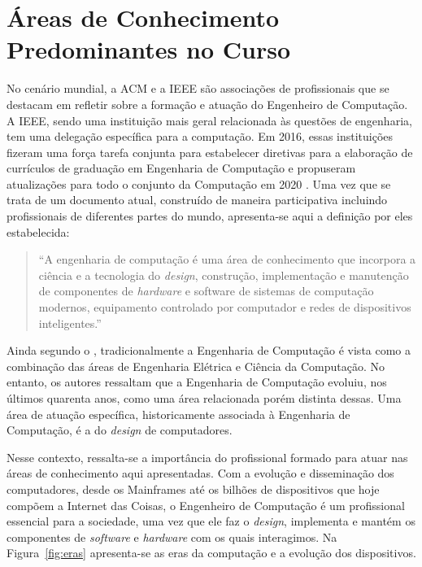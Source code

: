 
\section{Áreas de Conhecimento Predominantes no Curso}

No cenário mundial, a ACM e a IEEE são associações de profissionais que se destacam em refletir sobre a formação e atuação do Engenheiro de Computação. A IEEE, sendo uma instituição mais geral relacionada às questões de engenharia, tem uma delegação específica para a computação. Em 2016, essas instituições fizeram uma força tarefa conjunta para estabelecer diretivas para a elaboração de currículos de graduação em Engenharia de Computação \cite{CE2016} e propuseram atualizações para todo o conjunto da Computação em 2020 \cite{CC2020}.  Uma vez que se trata de um documento atual, construído de maneira participativa incluindo profissionais de diferentes partes do mundo, apresenta-se aqui a definição por eles estabelecida:

\begin{quote}
    ``A engenharia de computação é uma área de conhecimento que incorpora a ciência e a tecnologia do \textit{design}, construção, implementação e manutenção de componentes de \textit{hardware} e software de sistemas de computação modernos, equipamento controlado por computador e redes de dispositivos inteligentes.''~\cite[p.15]{CE2016}
\end{quote}

Ainda segundo o \textcite{CE2016}, tradicionalmente a Engenharia de Computação é vista como a combinação das áreas de Engenharia Elétrica e Ciência da Computação. No entanto, os autores ressaltam que a Engenharia de Computação evoluiu, nos últimos quarenta anos, como uma área relacionada porém distinta dessas. Uma área de atuação específica, historicamente associada à Engenharia de Computação, é a do \textit{design} de computadores.


Nesse contexto, ressalta-se a importância do profissional formado para atuar nas áreas de conhecimento aqui apresentadas. Com a evolução e disseminação dos computadores, desde os Mainframes até os bilhões de dispositivos que hoje compõem a Internet das Coisas, o Engenheiro de Computação é um profissional essencial para a sociedade, uma vez que ele faz o \textit{design}, implementa e mantém os componentes de \textit{software} e \textit{hardware} com os quais interagimos. Na Figura~\ref{fig:eras} apresenta-se as eras da computação e a evolução dos dispositivos.


